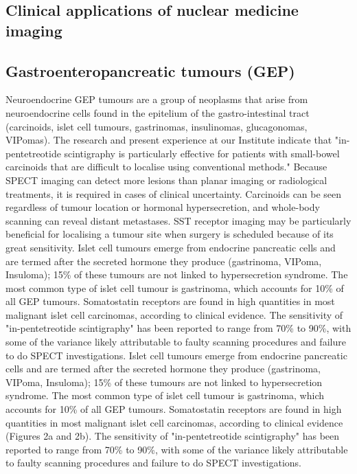 \documentclass{article}
\begin{document}
\begin{multicols}{2}
\section{Clinical applications of nuclear medicine imaging}

\subsection{Gastroenteropancreatic tumours (GEP)}
Neuroendocrine GEP tumours are a group of neoplasms that arise from neuroendocrine cells found in the epitelium of the gastro-intestinal tract (carcinoids, islet cell tumours, gastrinomas, insulinomas, glucagonomas, VIPomas). The research and present experience at our Institute indicate that "in-pentetreotide scintigraphy is particularly effective for patients with small-bowel carcinoids that are difficult to localise using conventional methods." Because SPECT imaging can detect more lesions than planar imaging or radiological treatments, it is required in cases of clinical uncertainty. Carcinoids can be seen regardless of tumour location or hormonal hypersecretion, and whole-body scanning can reveal distant metastases. SST receptor imaging may be particularly beneficial for localising a tumour site when surgery is scheduled because of its great sensitivity.
Islet cell tumours emerge from endocrine pancreatic cells and are termed after the secreted hormone they produce (gastrinoma, VIPoma, Insuloma); 15\% of these tumours are not linked to hypersecretion syndrome. The most common type of islet cell tumour is gastrinoma, which accounts for 10\% of all GEP tumours. Somatostatin receptors are found in high quantities in most malignant islet cell carcinomas, according to clinical evidence. The sensitivity of "in-pentetreotide scintigraphy" has been reported to range from 70\% to 90\%, with some of the variance likely attributable to faulty scanning procedures and failure to do SPECT investigations.
Islet cell tumours emerge from endocrine pancreatic cells and are termed after the secreted hormone they produce (gastrinoma, VIPoma, Insuloma); 15\% of these tumours are not linked to hypersecretion syndrome. The most common type of islet cell tumour is gastrinoma, which accounts for 10\% of all GEP tumours. Somatostatin receptors are found in high quantities in most malignant islet cell carcinomas, according to clinical evidence (Figures 2a and 2b). The sensitivity of "in-pentetreotide scintigraphy" has been reported to range from 70\% to 90\%, with some of the variance likely attributable to faulty scanning procedures and failure to do SPECT investigations.


\end{multicols}
\end{document}

